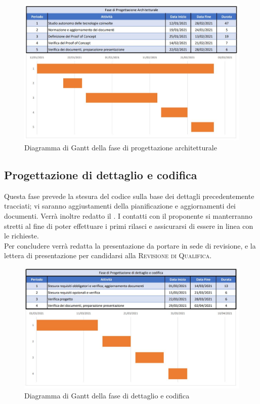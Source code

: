 \documentclass[../piano_di_progetto.tex]{subfiles}
\begin{document}
\begin{figure}[H]
\centering

\includegraphics[width=12cm]{componenti/img/fase_prog_archit}

\caption{Diagramma di Gantt della fase di progettazione architetturale}
\end{figure}


\subsection{Progettazione di dettaglio e codifica}%
\label{sub:prog_dett}
Questa fase prevede la stesura del codice sulla base dei dettagli precedentemente tracciati; vi saranno aggiustamenti della pianificazione e aggiornamenti dei documenti. Verrà inoltre redatto il \textsc{}. I contatti con il proponente si manterranno stretti al fine di poter effettuare i primi rilasci e assicurarsi di essere in linea con le richieste.\\
Per concludere verrà redatta la presentazione da portare in sede di revisione, e la lettera di presentazione per candidarsi alla \textsc{Revisione di Qualifica}. 

\begin{figure}[H]
\centering

\includegraphics[width=12cm]{componenti/img/fase_dett_cod}

\caption{Diagramma di Gantt della fase di dettaglio e codifica}
\end{figure}
\end{document}
